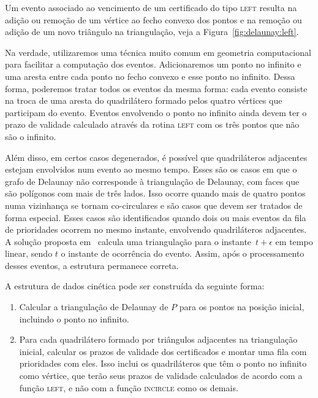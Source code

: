 

Um evento associado ao vencimento de um certificado do tipo \textsc{left} resulta na adição ou
remoção de um vértice ao fecho convexo dos pontos e na remoção ou adição de um novo triângulo na
triangulação, veja a Figura~\ref{fig:delaunay:left}.



Na verdade, utilizaremos uma técnica muito comum em geometria computacional para facilitar a
computação dos eventos.
Adicionaremos um ponto no infinito e uma aresta entre cada ponto no fecho convexo e esse ponto no
infinito.
Dessa forma, poderemos tratar todos os eventos da mesma forma: cada evento consiste na troca de uma
aresta do quadrilátero formado pelos quatro vértices que participam do evento.
Eventos envolvendo o ponto no infinito ainda devem ter o prazo de validade
calculado através da rotina \textsc{left} com os três pontos que não são o infinito.

Além disso, em certos casos degenerados, é possível que quadriláteros adjacentes estejam
envolvidos num evento ao mesmo tempo.
Esses são os casos em que o grafo de Delaunay não corresponde à triangulação de Delaunay, com
faces que são polígonos com mais de três lados.
Isso ocorre quando mais de quatro pontos numa vizinhança se tornam co-circulares e são casos que
devem ser tratados de forma especial.
Esses casos são identificados quando dois ou mais eventos da fila de prioridades ocorrem no mesmo
instante, envolvendo quadriláteros adjacentes.
A solução proposta em~\cite{aggarwal-guibas-saxe-shor} calcula uma triangulação para o
instante~$t + \epsilon$ em tempo linear, sendo $t$ o instante de ocorrência do evento.
Assim, após o processamento desses eventos, a estrutura permanece correta.

A estrutura de dados cinética pode ser construída da seguinte forma:
\begin{enumerate}
    \item Calcular a triangulação de Delaunay de $P$ para os pontos na posição inicial, incluindo
    o ponto no infinito.
    \item Para cada quadrilátero formado por triângulos adjacentes na triangulação inicial,
    calcular os prazos de validade dos certificados e montar uma fila com prioridades com eles.
    Isso inclui os quadriláteros que têm o ponto no infinito como vértice, que terão seus prazos
    de validade calculados de acordo com a função \textsc{left}, e não com a função
    \textsc{incircle} como os demais.
\end{enumerate}

